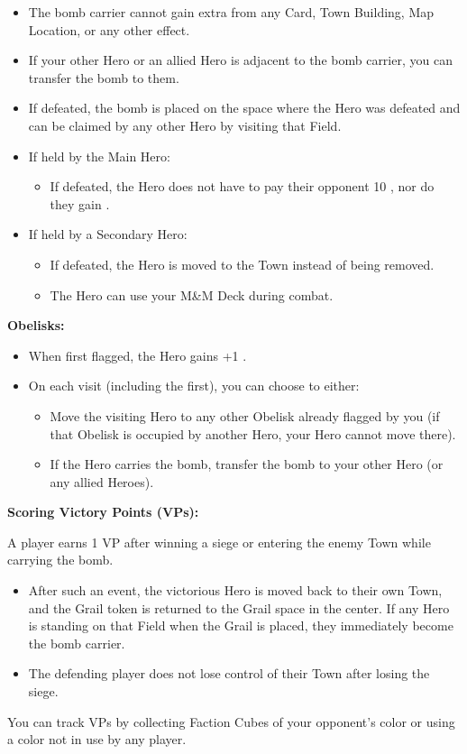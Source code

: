 \begin{multicols}{2}
\begin{itemize}
  \item The bomb carrier cannot gain extra  from any Card, Town Building, Map Location, or any other effect.
  \item If your other Hero or an allied Hero is adjacent to the bomb carrier, you can transfer the bomb to them.
  \item If defeated, the bomb is placed on the space where the Hero was defeated and can be claimed by any other Hero by visiting that Field.
  \item If held by the Main Hero:
  \begin{itemize}
    \item If defeated, the Hero does not have to pay their opponent 10 , nor do they gain .
  \end{itemize}
  \item If held by a Secondary Hero:
  \begin{itemize}
    \item If defeated, the Hero is moved to the Town instead of being removed.
    \item The Hero can use your M\&M Deck during combat.
  \end{itemize}
\end{itemize}

\textbf{Obelisks:}

\begin{itemize}
  \item When first flagged, the Hero gains +1 .
  \item On each visit (including the first), you can choose to either:
  \begin{itemize}
    \item Move the visiting Hero to any other Obelisk already flagged by you (if that Obelisk is occupied by another Hero, your Hero cannot move there).
    \item If the Hero carries the bomb, transfer the bomb to your other Hero (or any allied Heroes).
  \end{itemize}
\end{itemize}

\textbf{Scoring Victory Points (VPs):}

A player earns 1 VP after winning a siege or entering the enemy Town while carrying the bomb.
\begin{itemize}
  \item After such an event, the victorious Hero is moved back to their own Town, and the Grail token is returned to the Grail space in the center. If any Hero is standing on that Field when the Grail is placed, they immediately become the bomb carrier.
  \item The defending player does not lose control of their Town after losing the siege.
\end{itemize}

You can track VPs by collecting Faction Cubes of your opponent's color or using a color not in use by any player.

\end{multicols}

